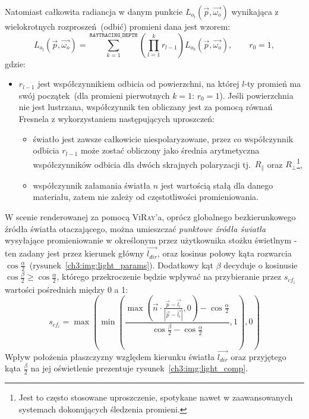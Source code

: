 \begin{enumerate}
Natomiast całkowita radiancja w danym punkcie $L_{o_t}(\vec{p}, \vec{\omega_o})$ wynikająca z wielokrotnych rozproszeń~(odbić) promieni dana jest wzorem:
\begin{equation}
L_{o_t}(\vec{p}, \vec{\omega_o}) = \sum_{k=1}^{\mathtt{RAYTRACING\_DEPTH}}\left(\prod_{l=1}^k r_{l-1} \right)L_{o_k}(\vec{p}, \vec{\omega_o}), \qquad r_0 = 1,
\label{ch3:eq:total_radiance}
\end{equation}
gdzie:
\begin{itemize}
\item[] $r_{l-1}$ jest współczynnikiem odbicia od powierzchni, na której $l$-ty promień ma swój początek~(dla promieni pierwotnych $k=1$: $r_0=1$). Jeśli powierzchnia nie jest lustrzana, współczynnik ten obliczany jest za pomocą równań Fresnela z wykorzystaniem następujących uproszczeń:
\begin{itemize}
\item światło jest zawsze całkowicie niespolaryzowane, przez co współczynnik odbicia $r_{l-1}$ może zostać obliczony jako średnia arytmetyczna współczynników odbicia dla dwóch skrajnych polaryzacji tj.~$R_\parallel$ oraz $R_\perp$\footnote{Jest to często stosowane uproszczenie, spotykane nawet w zaawansowanych systemach dokonujących śledzenia promieni.},
\item współczynnik załamania światła $n$ jest wartością stałą dla danego materiału, zatem nie zależy od częstotliwości promieniowania.
\end{itemize}
\end{itemize}

W scenie renderowanej za pomocą \textsc{ViRay}'a, oprócz globalnego bezkierunkowego źródła światła otaczającego, można umieszczać \textit{punktowe źródła światła} wysyłające promieniowanie w określonym przez użytkownika stożku świetlnym - ten zadany jest przez kierunek główny $\overrightarrow{l_{dir}}$, oraz kosinus połowy kąta rozwarcia $\cos \frac{\alpha}{2}$~(rysunek~\ref{ch3:img:light_params}). Dodatkowy kąt $\beta$ decyduje o kosinusie $\cos\frac{\beta}{2} \geq \cos\frac{\alpha}{2}$, którego przekroczenie będzie wpływać na przybieranie przez $s_{cf_i}$ wartości pośrednich między 0 a 1:
\begin{equation}
s_{cf_i} = \max\left(\min\left(  \frac{\max\left(\vec{n} \cdot \frac{\vec{p} - \vec{l_i}}{|\vec{p} - \vec{l_i}|}  , 0\right) - \cos\frac{\alpha}{2}}{\cos\frac{\beta}{2} - \cos\frac{\alpha}{2}}, 1\right), 0\right)
\end{equation}
Wpływ położenia płaszczyzny względem kierunku światła $\overrightarrow{l_{dir}}$ oraz przyjętego kąta $\frac{\beta}{2}$ na jej oświetlenie prezentuje rysunek~\ref{ch3:img:light_comp}.


\end{enumerate}
